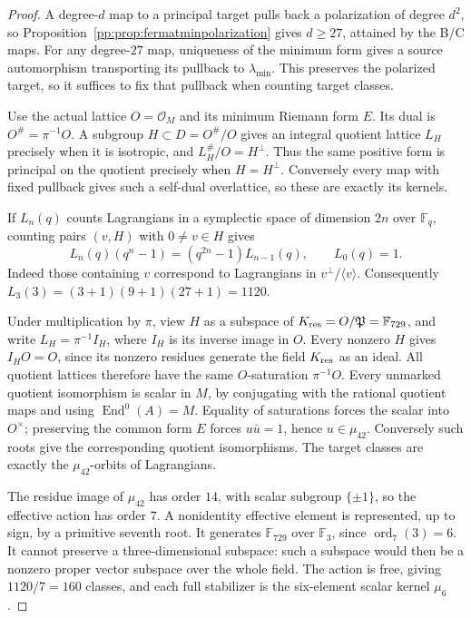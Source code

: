 \begin{proof}
A degree-$d$ map to a principal target pulls back a polarization of
degree $d^2$, so Proposition~\ref{pp:prop:fermatminpolarization}
gives $d\ge27$, attained by the B/C maps. For any degree-$27$ map,
uniqueness of the minimum form gives a source automorphism transporting
its pullback to $\lambda_{\min}$. This preserves the polarized target,
so it suffices to fix that pullback when counting target classes.

Use the actual lattice $O=\mathcal O_M$ and its minimum Riemann form
$E$. Its dual is $O^\#=\pi^{-1}O$. A subgroup
$H\subset D=O^\#/O$ gives an integral quotient lattice $L_H$ precisely
when it is isotropic, and $L_H^\#/O=H^\perp$. Thus the same positive
form is principal on the quotient precisely when $H=H^\perp$.
Conversely every map with fixed pullback gives such a self-dual
overlattice, so these are exactly its kernels.

If $L_n(q)$ counts Lagrangians in a symplectic space of dimension
$2n$ over $\mathbb F_q$, counting pairs $(v,H)$ with $0\ne v\in H$
gives
\[
 L_n(q)(q^n-1)=(q^{2n}-1)L_{n-1}(q),\qquad L_0(q)=1.
\]
Indeed those containing $v$ correspond to Lagrangians in
$v^\perp/\langle v\rangle$. Consequently
$L_3(3)=(3+1)(9+1)(27+1)=1120$.

Under multiplication by $\pi$, view $H$ as a subspace of
$K_{\rm res}=O/\mathfrak P=\mathbb F_{729}$, and write
$L_H=\pi^{-1}I_H$, where $I_H$ is its inverse image in $O$.
Every nonzero $H$ gives $I_HO=O$, since its nonzero residues
generate the field $K_{\rm res}$ as an ideal. All quotient lattices
therefore have the same $O$-saturation $\pi^{-1}O$.
Every unmarked quotient isomorphism is scalar in $M$, by conjugating
with the rational quotient maps and using $\operatorname{End}^0(A)=M$.
Equality of saturations forces the scalar into $O^\times$; preserving
the common form $E$ forces $u\bar u=1$, hence $u\in\mu_{42}$.
Conversely such roots give the corresponding quotient isomorphisms.
The target classes are exactly the $\mu_{42}$-orbits of Lagrangians.

The residue image of $\mu_{42}$ has order $14$, with scalar
subgroup $\{\pm1\}$, so the effective action has order $7$.
A nonidentity effective element is represented, up to sign, by a
primitive seventh root. It generates $\mathbb F_{729}$ over
$\mathbb F_3$, since $\operatorname{ord}_7(3)=6$.
It cannot preserve a three-dimensional subspace: such a subspace
would then be a nonzero proper vector subspace over the whole field.
The action is free, giving $1120/7=160$ classes, and each full
stabilizer is the six-element scalar kernel $\mu_6$.


\end{proof}
